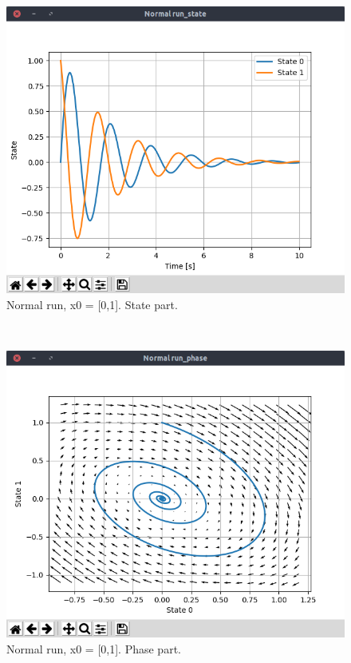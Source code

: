 \documentclass{cmc}
\begin{document}
\begin{minipage}[t]{0.49\textwidth}
	\begin{figure}[H]
		\centering
  		\includegraphics[width=\textwidth,trim={0 1.25cm 0 0},clip]{figures/ex2_normal_state.png}
  		\caption{Normal run, x0 = [0,1]. State part.}
  		\label{fig:ex2_normal_state}
	\end{figure}
\end{minipage}
~
\begin{minipage}[t]{0.49\textwidth}
	\begin{figure}[H]
  		\centering
  		\includegraphics[width=\textwidth,trim={0 1.25cm 0 0},clip]{figures/ex2_normal_phase.png}
  		\caption{Normal run, x0 = [0,1]. Phase part.}
  		\label{fig:ex2_normal_phase}
	\end{figure}
\end{minipage}
\end{document}
